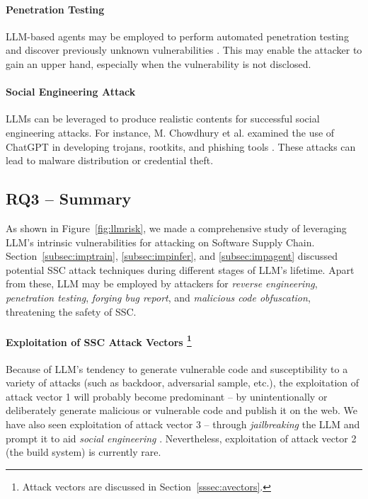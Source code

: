 \paragraph*{Penetration Testing}
LLM-based agents may be employed to perform automated penetration testing
and discover previously unknown vulnerabilities
 \citep{10970188,11418046,10.1145/3766895}. This may enable the attacker
to gain an upper hand, especially when the vulnerability is not
disclosed.

\paragraph*{Social Engineering Attack}
LLMs can be leveraged to produce realistic contents for successful
social engineering attacks. For instance, M. Chowdhury 
et al. examined the use of ChatGPT in developing trojans,
rootkits, and phishing tools \citep{10187385}.
These attacks  can lead to malware distribution or credential theft.

\subsection{RQ3 -- Summary}\label{subsec:rq3end}
\par As shown in Figure~\ref{fig:llmrisk}, we made a comprehensive study
of leveraging LLM's intrinsic vulnerabilities for attacking on Software Supply
Chain. Section~\ref{subsec:imptrain}, \ref{subsec:impinfer}, and \ref{subsec:impagent}
discussed potential SSC attack techniques during different stages of LLM's lifetime.
Apart from these, LLM may be employed by attackers for \textit{reverse engineering},
\textit{penetration testing}, \textit{forging bug report}, 
and \textit{malicious code obfuscation},
threatening the safety of SSC.

\paragraph*{Exploitation of SSC Attack Vectors 
\footnote{Attack vectors are discussed in Section~\ref{sssec:avectors}.}} 
Because of LLM's tendency to
generate vulnerable code \citep{copilotsecurity} and susceptibility
to a variety of attacks (such as backdoor, adversarial sample, etc.), 
the exploitation of attack vector 1  
will probably become predominant -- by unintentionally or deliberately
generate malicious or vulnerable code and publish it on the web.
We have also seen exploitation of attack vector 3 -- through \textit{jailbreaking} the
LLM and prompt it to aid \textit{social engineering} \citep{10187385}.
Nevertheless, exploitation of attack vector 2 (the build system) is
currently rare.

